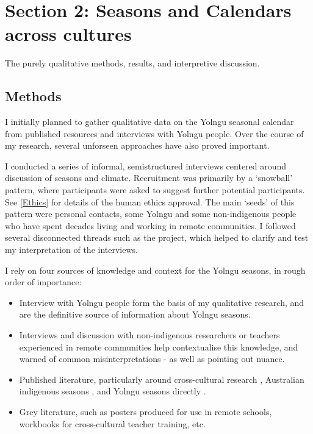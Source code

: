 \chapter{Section 2:  Seasons and Calendars across cultures}
The purely qualitative methods, results, and interpretive discussion.

\section{Methods}

I initially planned to gather qualitative data on the Yolngu seasonal calendar
from published resources and interviews with Yolngu people.
Over the course of my research, several unforseen approaches have also proved important.

I conducted a series of informal, semistructured interviews centered around discussion of seasons and climate.
Recruitment was primarily by a `snowball' pattern, where participants were asked to
suggest further potential participants.
See \ref{Ethics} for details of the human ethics approval.
The main `seeds' of this pattern were personal contacts, some Yolngu and some non-indigenous
people who have spent decades living and working in remote communities.
I followed several disconnected threads such as the \citet{CSIROcals} project,
which helped to clarify and test my interpretation of the interviews.

I rely on four sources of knowledge and context for the Yolngu seasons, in rough order of importance:

\begin{itemize}
\item Interview with Yolngu people form the basis of my qualitative research, and
        are the definitive source of information about Yolngu seasons.
\item Interviews and discussion with non-indigenous researchers or teachers experienced
        in remote communities help contextualise this knowledge, and warned of
        common misinterpretations - as well as pointing out nuance.
\item Published literature, particularly around cross-cultural research \citep[eg.][]{smith1999},
        Australian indigenous seasons \citep[eg.][]{prober2011,oconnor2010}, and Yolngu
        seasons directly \citep{davis1989}.
\item Grey literature, such as posters produced for use in remote schools, workbooks
        for cross-cultural teacher training, etc.
\end{itemize}

